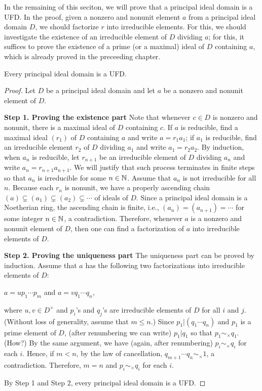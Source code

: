 In the remaining of this seciton, we will prove that a principal ideal domain is a UFD.
In the proof, given a nonzero and nonunit element $a$ from a principal ideal domain $D$, we should factorize $r$ into irreducible elements.
For this, we should investigate the existence of an irreducible element of $D$ dividing $a$; for this, it suffices to prove the existence of a prime (or a maximal) ideal of $D$ containing $a$, which is already proved in the preceeding chapter.
\begin{thm}
    Every principal ideal domain is a UFD.
\end{thm}
\begin{proof}
    Let $D$ be a principal ideal domain and let $a$ be a nonzero and nonunit element of $D$.

    \textbf{Step 1. Proving the existence part}\newline\indent
    Note that whenever $c\in D$ is nonzero and nonunit, there is a maximal ideal of $D$ containing $c$.
    If $a$ is reducible, find a maximal ideal $(r_1)$ of $D$ containing $a$ and write $a=r_1a_1$; if $a_1$ is reducible, find an irreducible element $r_2$ of $D$ dividing $a_1$ and write $a_1=r_2a_2$.
    By induction, when $a_n$ is reducible, let $r_{n+1}$ be an irreducible element of $D$ dividing $a_n$ and write $a_n=r_{n+1}a_{n+1}$.
    We will justify that such process terminates in finite steps so that $a_n$ is irreducible for some $n\in{\mathbb{N}}$.
    Assume that $a_n$ is not irreducible for all $n$.
    Because each $r_n$ is nonunit, we have a properly ascending chain $(a)\subsetneq (a_1)\subsetneq (a_2)\subsetneq\cdots$ of ideals of $D$.
    Since a principal ideal domain is a Noetherian ring, the ascending chain is finite, i.e., $(a_n)=(a_{n+1})=\cdots$ for some integer $n\in{\mathbb{N}}$, a contradiction.
    Therefore, whenever $a$ is a nonzero and nonunit element of $D$, then one can find a factorization of $a$ into irreducible elements of $D$.

    \textbf{Step 2. Proving the uniqueness part}\newline\indent
    The uniqueness part can be proved by induction.
    Assume that $a$ has the following two factorizations into irreducible elements of $D$:
    \begin{center}
        $a=u p_1 \cdots p_m$ and $a=v q_1 \cdots q_n$,
    \end{center}
    where $u, v\in D^\times$ and $p_i$'s and $q_j$'s are irreducible elements of $D$ for all $i$ and $j$. (Without loss of generality, assume that $m\leq n$.)
    Since $p_1|(q_1\cdots q_n)$ and $p_1$ is a prime element of $D$, (after renumbering we can write) $p_1|q_1$ so that $p_1\sim_\times q_1$. \color{brown}(How?) \color{black}
    By the same argument, we have (again, after renumbering) $p_i\sim_\times q_i$ for each $i$.
    Hence, if $m<n$, by the law of cancellation, $q_{m+1}\cdots q_n\sim_\times 1$, a contradiction.
    Therefore, $m=n$ and $p_i\sim_\times q_i$ for each $i$.

    By Step 1 and Step 2, every principal ideal domain is a UFD.
\end{proof}
